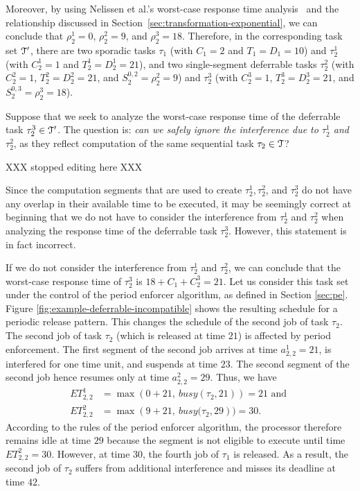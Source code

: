 Moreover, by using Nelissen et al.'s worst-case response time analysis~\cite{ecrts15nelissen} and the relationship discussed in Section~\ref{sec:transformation-exponential}, we can conclude that
$\rho_2^1 = 0$, $\rho_2^2 = 9$, and $\rho_2^3 = 18$.
Therefore, in the corresponding task set $\mathcal{T}'$, there are two sporadic tasks $\tau_1$ (with  $C_1 = 2$ and $T_1=D_1=10$) and $\tau_2^1$ (with  $C_2^1 = 1$ and $T^1_2=D^1_2=21$), and two single-segment deferrable tasks $\tau_2^2$ (with  $C_2^2 = 1$, $T^2_2=D^2_2=21$, and $S_2^{0,2} = \rho_2^2 = 9$) and $\tau_2^3$ (with  $C_2^3 = 1$, $T^3_2=D^3_2=21$, and $S_2^{0,3} = \rho_2^3 = 18$).

Suppose that we seek to analyze the worst-case response time of the deferrable task $\tau_2^3 \in \mathcal{T}'$. The question is: \emph{can we safely ignore the interference due to $\tau_2^1$ and $\tau_2^2$}, as they reflect computation of the same sequential task $\tau_2 \in \mathcal{T}$?


XXX stopped editing here XXX

Since the computation segments that are used to create $\tau_2^1, \tau_2^2$, and $\tau_2^3$ do not have any overlap in their available time to be executed, it may be seemingly correct at beginning that we do not have to consider the interference from $\tau_2^1$ and $\tau_2^2$ when analyzing the response time of the deferrable task $\tau_2^3$. However, this statement is in fact incorrect.


If we do not consider the interference from $\tau_2^1$ and $\tau_2^2$, we can conclude that the worst-case response time of $\tau_2^3$ is  $18+C_1+C_2^3=21$.
Let us consider this task set under the control of the period enforcer algorithm, as defined in Section \ref{sec:pe}.
Figure \ref{fig:example-deferrable-incompatible} shows the resulting schedule for a periodic release pattern. This changes the schedule of the second job of task $\tau_2$. 
The second job of task $\tau_2$ (which is released at time $21$) is affected by period enforcement. The first segment of the second job arrives at time $a^1_{2,2} = 21$, is interfered for one time unit, and suspends at time $23$. The  second segment of the second job hence resumes only at time $a^2_{2,2} = 29$. Thus, we have
\begin{align*}
	ET_{2,2}^1 & = \max\left(0 + 21,\ \mathit{busy}(\tau_2, 21)\right) = 21  \text{ and }
\\
	ET_{2,2}^2 & = \max\left(9 + 21,\ \mathit{busy}(\tau_2, 29\right) ) = 30.
\end{align*}
According to the rules of the period enforcer algorithm, the processor therefore remains idle at time $29$ because the segment is not eligible to execute until time $ET_{2,2}^2 = 30$. However, at time $30$, the fourth job of $\tau_1$ is released. As a result, the second job of $\tau_2$ suffers from additional interference and misses its deadline at time $42$.

